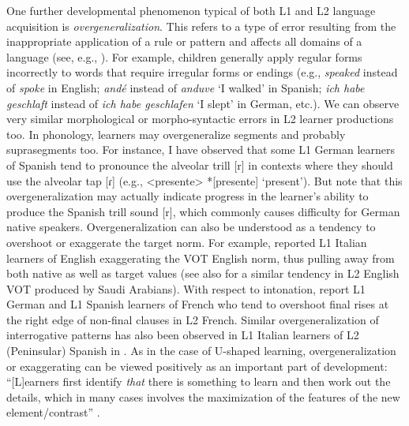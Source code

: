 One further developmental phenomenon typical of both L1 and L2 language acquisition is \textit{overgeneralization}. This refers to a type of error resulting from the inappropriate application of a rule or pattern and affects all domains of a language (see, e.g., \citealt{R.Ellis1994, WittekTomasello2002, Franceschina2005, GassSelinker2008, MontrulEtAl2010, LightbownSpada2013}). For example, children generally apply regular forms incorrectly to words that require irregular forms or endings (e.g., \textit{speaked} instead of \textit{spoke} in English; \textit{andé} instead of \textit{anduve} ‘I walked’ in Spanish; \textit{ich habe geschlaft} instead of \textit{ich habe geschlafen} ‘I slept’ in German, etc.). We can observe very similar morphological or morpho-syntactic errors in L2 learner productions too. In phonology, learners may overgeneralize segments and probably suprasegments too. For instance, I have observed that some L1 German learners of Spanish tend to pronounce the alveolar trill [r] in contexts where they should use the alveolar tap [ɾ] (e.g., <presente> *[presente] ‘present’). But note that this overgeneralization may actually indicate progress in the learner’s ability to produce the Spanish trill sound [r], which commonly causes difficulty for German native speakers. Overgeneralization can also be understood as a tendency to overshoot or exaggerate the target norm. For example, \citet{Gass1984} reported L1 Italian learners of English exaggerating the VOT English norm, thus pulling away from both native as well as target values (see also \citealt{Flege1980} for a similar tendency in L2 English VOT produced by Saudi Arabians). With respect to intonation, \citet{SantiagoDelais-Roussarie2015a} report L1 German and L1 Spanish learners of French who tend to overshoot final rises at the right edge of non-final clauses in L2 French. Similar overgeneralization of interrogative patterns has also been observed in L1 Italian learners of L2 (Peninsular) Spanish in \citet{GabrielKireva2014a}. As in the case of U-shaped learning, overgeneralization or exaggerating can be viewed positively as an important part of development: “[L]earners first identify \textit{that} there is something to learn and then work out the details, which in many cases involves the maximization of the features of the new element/contrast” \citep[394]{Gass1988}.



